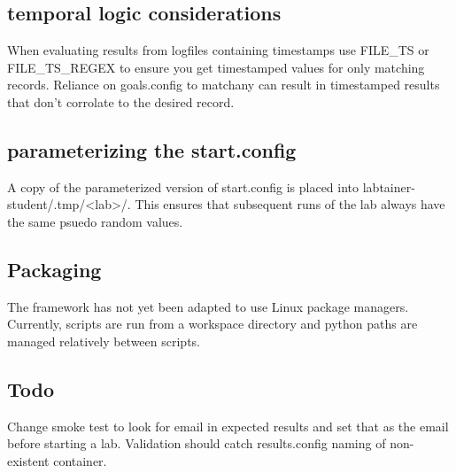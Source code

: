 \documentclass[12pt]{article}
\begin{document}
\subsection {temporal logic considerations}
When evaluating results from logfiles containing timestamps use FILE\_TS or FILE\_TS\_REGEX
to ensure you get timestamped values for only matching records. Reliance on goals.config to
matchany can result in timestamped results that don't corrolate to the desired record. 

\subsection {parameterizing the start.config}
A copy of the parameterized version of start.config is placed into 
labtainer-student/.tmp/<lab>/.  This ensures that subsequent runs of the lab always
have the same psuedo random values.

\subsection {Packaging}
The framework has not yet been adapted to use Linux package managers.
Currently, scripts are run from a workspace directory and python
paths are managed relatively between scripts.  

\subsection{Todo}
Change smoke test to look for email in expected results and set that as the email before starting a lab.
Validation should catch results.config naming of non-existent container.
\end{document}
